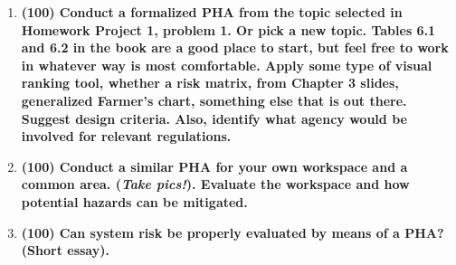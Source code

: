 \documentclass[11pt,a4paper]{article}
\begin{document}
\begin{enumerate}[leftmargin=*,topsep=0pt,font=\bfseries]
    \item\textbf{(100) Conduct a formalized PHA from the topic selected in Homework Project 1, problem 1. Or pick a new topic. Tables 6.1 and 6.2 in the book are a good place to start, but feel free to work in whatever way is most comfortable. Apply some type of visual ranking tool, whether a risk matrix, from Chapter 3 slides, generalized Farmer’s chart, something else that is out there. Suggest design criteria. Also, identify what agency would be involved for relevant regulations.}
        \vspace{\baselineskip}
    
        
        
        
        
        
        
        
        
        
        
        
        
        
        \newpage
    \item\textbf{(100) Conduct a similar PHA for your own workspace and a common area. (\textit{Take pics!}). Evaluate the workspace and how potential hazards can be mitigated.}
        \vspace{\baselineskip}
        
        
        
        
        
        
        
        
        
        
        
        
        
        
        \newpage
    \item\textbf{(100) Can system risk be properly evaluated by means of a PHA? (Short essay).}
        \vspace{\baselineskip}

        
        
        
        
        
        
        
        
        
        
        
        
        

        
        

\end{enumerate}
\end{document}
